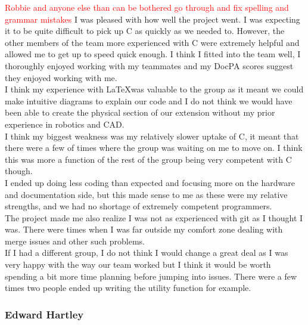 \documentclass[8pt]{article}
\begin{document}
\textcolor{red}{Robbie and anyone else than can be bothered go through and fix spelling and grammar mistakes}
I was pleased with how well the project went. I was expecting it to be quite difficult to pick up C as quickly as we needed to. However, the other members of the team more experienced with C were extremely helpful and allowed me to get up to speed quick enough. I think I fitted into the team well, I thoroughly enjoyed working with my teammates and my DocPA scores suggest they enjoyed working with me. \\
I think my experience with \LaTeX \space was valuable to the group as it meant we could make intuitive diagrams to explain our code and I do not think we would have been able to create the physical section of our extension without my prior experience in robotics and CAD.  \\
I think my biggest weakness was my relatively slower uptake of C, it meant that there were a few of times where the group was waiting on me to move on. I think this was more a function of the rest of the group being very competent with C though. \\
I ended up doing less coding than expected and focusing more on the hardware and documentation side, but this made sense to me as these were my relative strengths, and we had no shortage of extremely competent programmers.  \\
The project made me also realize I was not as experienced with git as I thought I was. There were times when I was far outside my comfort zone dealing with merge issues and other such problems.  \\
If I had a different group, I do not think I would change a great deal as I was very happy with the way our team worked but I think it would be worth spending a bit more time planning before jumping into issues. There were a few times two people ended up writing the utility function for example. 



\subsubsection{Edward Hartley}
\end{document}
